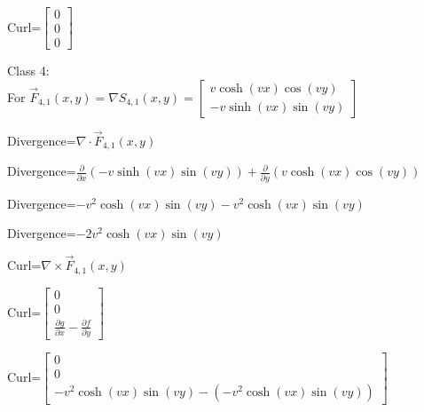 \documentclass[12pt, executivepaper]{article}
\begin{document}
\begin{flushleft}
\vspace{3mm}

Curl=$\begin{bmatrix}
0 \\
0 \\
0
\end{bmatrix}$ \\

\vspace{5mm}

Class 4: \\

For $\vec F_{4,1}(x,y)=\nabla S_{4,1}(x,y)=
\begin{bmatrix}
v\cosh(vx)\cos(vy) \\
-v\sinh(vx)\sin(vy)
\end{bmatrix}$

\vspace{3mm}

Divergence=$\nabla \cdot \vec F_{4,1}(x,y)$ \\

\vspace{3mm}

Divergence=$\frac{\partial}{\partial x}(-v\sinh(vx)\sin(vy))+\frac{\partial}{\partial y}(v\cosh(vx)\cos(vy))$ \\

\vspace{3mm}

Divergence=$-v^2\cosh(vx)\sin(vy)-v^2\cosh(vx)\sin(vy)$ \\

\vspace{3mm}

Divergence=$-2v^2\cosh(vx)\sin(vy)$ \\

\vspace{3mm}

Curl=$\nabla \times \vec F_{4,1}(x,y)$ \\

\vspace{3mm}

Curl=$\begin{bmatrix}
0 \\
0 \\
\frac{\partial g}{\partial x}-\frac{\partial f}{\partial y}
\end{bmatrix}$ \\

\vspace{3mm}

Curl=$\begin{bmatrix}
0 \\
0 \\
-v^2\cosh(vx)\sin(vy)-(-v^2\cosh(vx)\sin(vy))
\end{bmatrix}$ \\


\end{flushleft}
\end{document}
